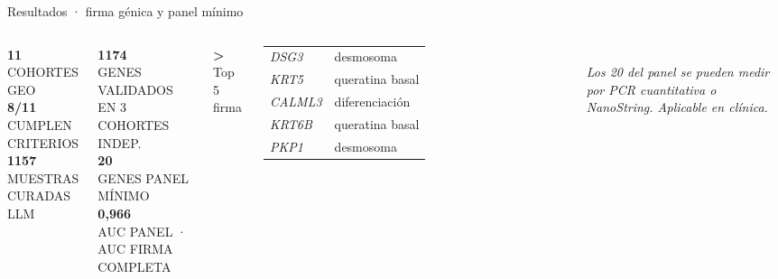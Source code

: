 \documentclass[aspectratio=169, 11pt]{beamer}
\newcommand{\gene}[1]{\textit{#1}}
\newcommand{\kicker}[1]{{\ttfamily\small\color{verdeTerm}\textbf{>} #1}}
\newcommand{\bignum}[1]{{\fontsize{40pt}{40pt}\selectfont\color{verdeTerm}\textbf{#1}}}
\newcommand{\mednum}[1]{{\fontsize{28pt}{28pt}\selectfont\color{verdeTerm}\textbf{#1}}}
\newcommand{\lbl}[1]{{\ttfamily\scriptsize\color{mute}\MakeUppercase{#1}}}
\begin{document}
\begin{frame}{Resultados · firma génica y panel mínimo}
  \vspace{0.2cm}
  \begin{columns}[T]
    \bignum{11}\\\lbl{cohortes GEO}\\[0.4cm]
    \bignum{8/11}\\\lbl{cumplen criterios}\\[0.4cm]
    \bignum{1157}\\\lbl{muestras curadas LLM}

    \bignum{1174}\\\lbl{genes validados}\\
    \lbl{en 3 cohortes indep.}\\[0.4cm]
    \bignum{20}\\\lbl{genes panel mínimo}\\[0.4cm]
    \mednum{0{,}966}\\
    \lbl{auc panel · auc firma completa}

    \kicker{Top 5 firma}\\[0.15cm]
    {\small
    \begin{tabular}{@{}ll@{}}
      \gene{DSG3}   & desmosoma\\
      \gene{KRT5}   & queratina basal\\
      \gene{CALML3} & diferenciación\\
      \gene{KRT6B}  & queratina basal\\
      \gene{PKP1}   & desmosoma\\
    \end{tabular}}\\[0.4cm]

    {\small\itshape\color{verdeOsc}Los 20 del panel se pueden medir
    por PCR cuantitativa o \emph{NanoString}. Aplicable en clínica.}
  \end{columns}
\end{frame}
\end{document}
